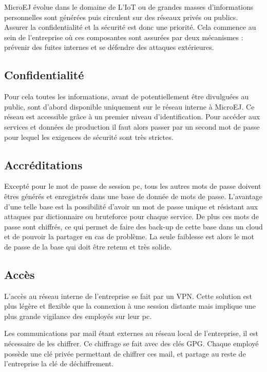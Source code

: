\documentclass[french,a4paper,12pt]{report}
\begin{document}
MicroEJ évolue dans le domaine de L'IoT ou de grandes masses d'informations personnelles sont générées puis circulent sur des réseaux privés ou publics. Assurer la confidentialité et la sécurité est donc une priorité. Cela commence au sein de l'entreprise où ces composantes sont assurées par deux mécanismes : prévenir des fuites internes et se défendre des attaques extérieures.

\subsection{Confidentialité}

Pour cela toutes les informations, avant de potentiellement être divulguées au public, sont d'abord disponible uniquement sur le réseau interne à MicroEJ. Ce réseau est accessible grâce à un premier niveau d'identification. Pour accéder aux services et données de production il faut alors passer par un second mot de passe pour lequel les exigences de sécurité sont très strictes.


\subsection{Accréditations}

Excepté pour le mot de passe de session pc, tous les autres mots de passe doivent êtres générés et enregistrés dans une base de donnée de mots de passe. L’avantage d’une telle base est la possibilité d’avoir un mot de passe unique et résistant aux attaques par dictionnaire ou bruteforce pour chaque service. De plus ces mots de passe sont chiffrés, ce qui permet de faire des back-up de cette base dans un cloud et de pouvoir la partager en cas de problème. La seule faiblesse est alors le mot de passe de la base qui doit être retenu et très solide.

\subsection{Accès}

L’accès au réseau interne de l’entreprise se fait par un VPN. Cette solution est plus légère et flexible que la connexion à une session distante mais implique une plus grande vigilance des employés sur leur pc. 

Les communications par mail étant externes au réseau local de l’entreprise, il est nécessaire de les chiffrer. Ce chiffrage se fait avec des clés GPG. Chaque employé possède une clé privée permettant de chiffrer ces mail, et partage au reste de l'entreprise la clé de déchiffrement. 
\end{document}
